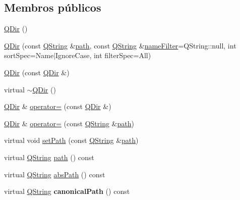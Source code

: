 \subsection*{Membros públicos}
\begin{DoxyCompactItemize}
\item 
\hyperlink{class_q_dir_ac92af10ffd2a612dcddbb6b76daacd79}{Q\-Dir} ()
\item 
\hyperlink{class_q_dir_ada2fef9adbc6d956ffeb771ff82b089f}{Q\-Dir} (const \hyperlink{class_q_string}{Q\-String} \&\hyperlink{class_q_dir_abef507bc8e9b061531a77dc84e991255}{path}, const \hyperlink{class_q_string}{Q\-String} \&\hyperlink{class_q_dir_a52e506d0a7174c22b22f5f7c663b7e24}{name\-Filter}=Q\-String\-::null, int sort\-Spec=Name$|$Ignore\-Case, int filter\-Spec=All)
\item 
\hyperlink{class_q_dir_a6166c6567dc4f3e9f1ebdc7afb59ee83}{Q\-Dir} (const \hyperlink{class_q_dir}{Q\-Dir} \&)
\item 
virtual \hyperlink{class_q_dir_a3dc50efd2789dc7f184143a40e122304}{$\sim$\-Q\-Dir} ()
\item 
\hyperlink{class_q_dir}{Q\-Dir} \& \hyperlink{class_q_dir_adbd8dd48a4d66c4149c4af35184988e4}{operator=} (const \hyperlink{class_q_dir}{Q\-Dir} \&)
\item 
\hyperlink{class_q_dir}{Q\-Dir} \& \hyperlink{class_q_dir_a0b1b140d489398d746bdc48e69f3b5a4}{operator=} (const \hyperlink{class_q_string}{Q\-String} \&\hyperlink{class_q_dir_abef507bc8e9b061531a77dc84e991255}{path})
\item 
virtual void \hyperlink{class_q_dir_af4c459056e34ddd0050ab9473def6db1}{set\-Path} (const \hyperlink{class_q_string}{Q\-String} \&\hyperlink{class_q_dir_abef507bc8e9b061531a77dc84e991255}{path})
\item 
virtual \hyperlink{class_q_string}{Q\-String} \hyperlink{class_q_dir_abef507bc8e9b061531a77dc84e991255}{path} () const 
\item 
virtual \hyperlink{class_q_string}{Q\-String} \hyperlink{class_q_dir_a57ff66cd13af0071d9869dd5e10db5c5}{abs\-Path} () const 
\item 
\hypertarget{class_q_dir_a82d81d953399417ba00a3d9a7ea3ef60}{virtual \hyperlink{class_q_string}{Q\-String} {\bfseries canonical\-Path} () const }\label{class_q_dir_a82d81d953399417ba00a3d9a7ea3ef60}


\end{DoxyCompactItemize}
